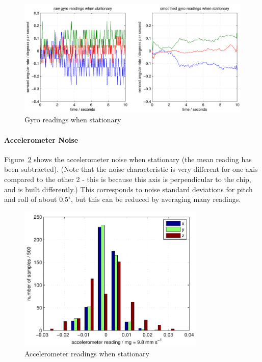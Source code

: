 \documentclass{IIBproject}
\begin{document}
\begin{figure}[htpb]
  \begin{center}
    \includegraphics[width=13cm]{figures/gyro_stat.pdf}
    \end{center}
    \caption{Gyro readings when stationary}
    \label{fig:gyro_stat}
    \end{figure}

\paragraph{Accelerometer Noise}
Figure~\ref{fig:acc_stat} shows the accelerometer noise when stationary (the
mean reading has been subtracted). (Note that the noise characteristic is very
different for one axis compared to the other 2 - this is because this axis is
perpendicular to the chip, and is built differently.) This corresponds to
noise standard deviations for pitch and roll of about 0.5$^\circ$, but this
can be reduced by averaging many readings.

\begin{figure}[htpb]
  \begin{center}
    \includegraphics[height=7cm]{figures/acc_stat.pdf}
    \end{center}
    \caption{Accelerometer readings when stationary}
    \label{fig:acc_stat}
    \end{figure}
\end{document}
